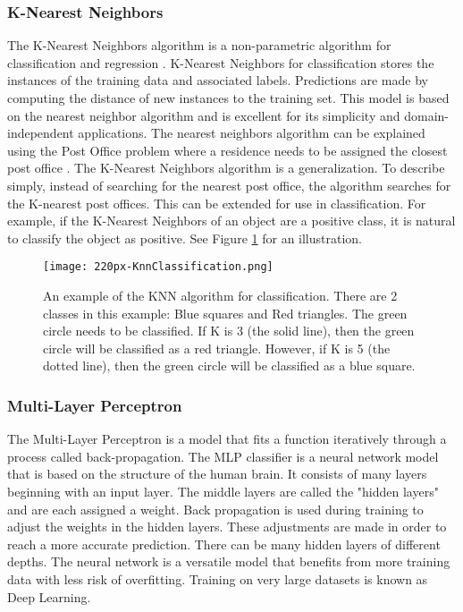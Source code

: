 \subsubsection{K-Nearest Neighbors}
The K-Nearest Neighbors algorithm is a non-parametric algorithm for classification and regression \cite{altman1992introduction}.
K-Nearest Neighbors for classification stores the instances of the training data and associated labels.
Predictions are made by computing the distance of new instances to the training set.
This model is based on the nearest neighbor algorithm and is excellent for its simplicity and domain-independent applications.
The nearest neighbors algorithm can be explained using the Post Office problem where a residence needs to be assigned the closest post office \cite{knuth1997art}.
The K-Nearest Neighbors algorithm is a generalization.
To describe simply, instead of searching for the nearest post office, the algorithm searches for the K-nearest post offices.
This can be extended for use in classification.
For example, if the K-Nearest Neighbors of an object are a positive class, it is natural to classify the object as positive.
See Figure \ref{fig:knn} for an illustration.

\begin{figure}[htp]
    \centering
    \texttt{[image: 220px-KnnClassification.png]}
    \caption{An example of the KNN algorithm for classification.
    There are 2 classes in this example: Blue squares and Red triangles.
    The green circle needs to be classified.
    If K is 3 (the solid line), then the green circle will be classified as a red triangle.
    However, if K is 5 (the dotted line), then the green circle will be classified as a blue square.}
    \label{fig:knn}
\end{figure}


\subsubsection{Multi-Layer Perceptron}
The Multi-Layer Perceptron is a model that fits a function iteratively through a process called back-propagation.
The MLP classifier is a neural network model that is based on the structure of the human brain.
It consists of many layers beginning with an input layer.
The middle layers are called the "hidden layers" and are each assigned a weight.
Back propagation is used during training to adjust the weights in the hidden layers.
These adjustments are made in order to reach a more accurate prediction.
There can be many hidden layers of different depths.
The neural network is a versatile model that benefits from more training data with less risk of overfitting.
Training on very large datasets is known as Deep Learning.

